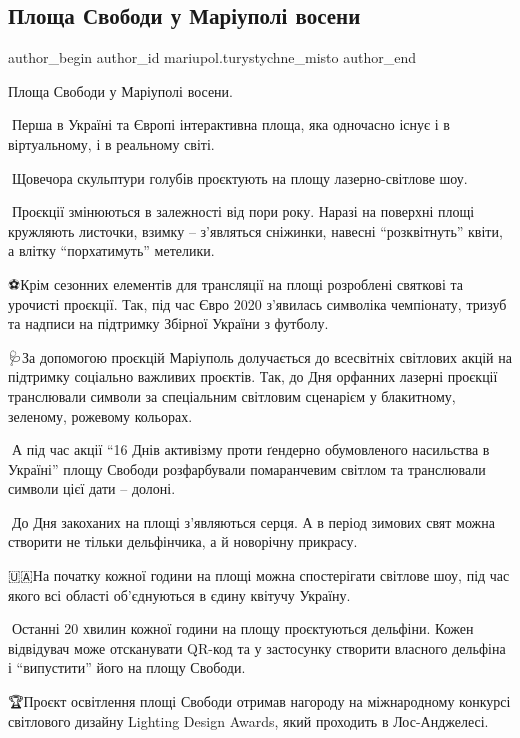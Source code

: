  
 
 
 
 

\subsection{Площа Свободи у Маріуполі восени}
\label{sec:10_11_2021.fb.mariupol.turystychne_misto.1.ploscha_svobody_voseny}

\ifcmt
 author_begin
   author_id mariupol.turystychne_misto
 author_end
\fi

Площа Свободи у Маріуполі восени.

🍂Перша в Україні та Європі інтерактивна площа, яка одночасно існує і в віртуальному, і в реальному світі.

🌠Щовечора скульптури голубів проєктують на площу лазерно-світлове шоу. 

🍁Проєкції змінюються в залежності від пори року. Наразі на поверхні площі
кружляють листочки, взимку – з'являться сніжинки, навесні \enquote{розквітнуть} квіти,
а влітку \enquote{порхатимуть} метелики. 

⚽️Крім сезонних елементів для трансляції на площі розроблені святкові та
урочисті проєкції. Так,  під час Євро 2020 з'явилась символіка чемпіонату,
тризуб та надписи на підтримку Збірної України з футболу.

🩺За допомогою проєкцій Маріуполь долучається до всесвітніх світлових акцій на
підтримку соціально важливих проєктів. Так,  до Дня орфанних лазерні проєкції
транслювали символи за спеціальним світловим сценарієм у блакитному, зеленому,
рожевому кольорах.

👐А під час акції \enquote{16 Днів активізму проти ґендерно обумовленого насильства в
Україні} площу Свободи розфарбували помаранчевим світлом та транслювали символи
цієї дати – долоні.

💛До Дня закоханих на площі з'являються серця. А в період зимових свят можна
створити не тільки дельфінчика, а й новорічну прикрасу.

🇺🇦На початку кожної години на площі можна спостерігати світлове шоу, під час
якого всі області об'єднуються в єдину квітучу Україну.

🐬Останні 20 хвилин кожної години на площу проєктуються дельфіни. Кожен
відвідувач може отсканувати QR-код та у застосунку створити власного дельфіна і
\enquote{випустити} його на площу Свободи.

🏆Проєкт освітлення площі Свободи отримав нагороду на міжнародному конкурсі
світлового дизайну Lighting Design Awards, який проходить в Лос-Анджелесі.
